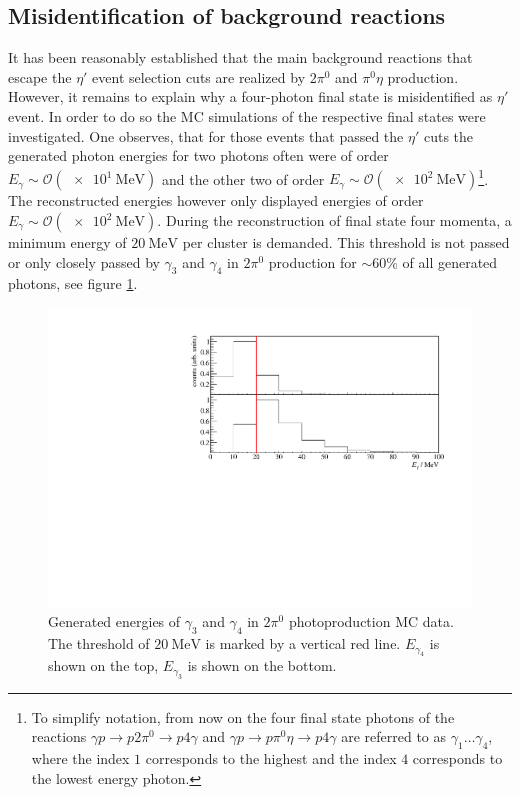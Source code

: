 \subsection{Misidentification of background reactions}
It has been reasonably established that the main background reactions that escape the $\eta'$ event selection cuts are realized by $2\pi^0$ and $\pi^0\eta$ production. However, it remains to explain why a four-photon final state is misidentified as $\eta'$ event. In order to do so the MC simulations of the respective final states were investigated. One observes, that for those events that passed the $\eta'$ cuts the generated photon energies for two photons often were of order $E_{\gamma} \sim \mathcal{O}(\SI{e1}{\mega\eV})$ and the other two of order $E_{\gamma} \sim \mathcal{O}(\SI{e2}{\mega\eV})$\footnote{To simplify notation, from now on the four final state photons of the reactions $\gamma p \to p2\pi^0\to p4\gamma$ and $\gamma p \to p\pi^0\eta\to p 4\gamma$ are referred to as $\gamma_1\dots\gamma_4$, where the index $1$ corresponds to the highest and the index $4$ corresponds to the lowest energy photon. }. The reconstructed energies however only displayed energies of order $E_{\gamma} \sim \mathcal{O}(\SI{e2}{\mega\eV})$.  During the reconstruction of final state four momenta, a minimum energy of $\SI{20}{\mega\eV}$ per cluster is demanded. This threshold is not passed or only closely passed by $\gamma_3$ and $\gamma_4$ in $2\pi^0$ production for $\sim 60\%$ of all generated photons, see figure \ref{fig:mcgammas_a}.\begin{figure}[htbp]
	\centering
	\includegraphics[width=\linewidth]{../figs/hydrogen/mcgammas.pdf}
	\caption{Generated energies of  $\gamma_3$ and $\gamma_4$ in $2\pi^0$ photoproduction MC data. The threshold of $\SI{20}{\mega\eV}$ is marked by a vertical red line. $E_{\gamma_4}$ is shown on the top, $E_{\gamma_3}$ is shown on the bottom.}
	\label{fig:mcgammas_a}			
\end{figure}
